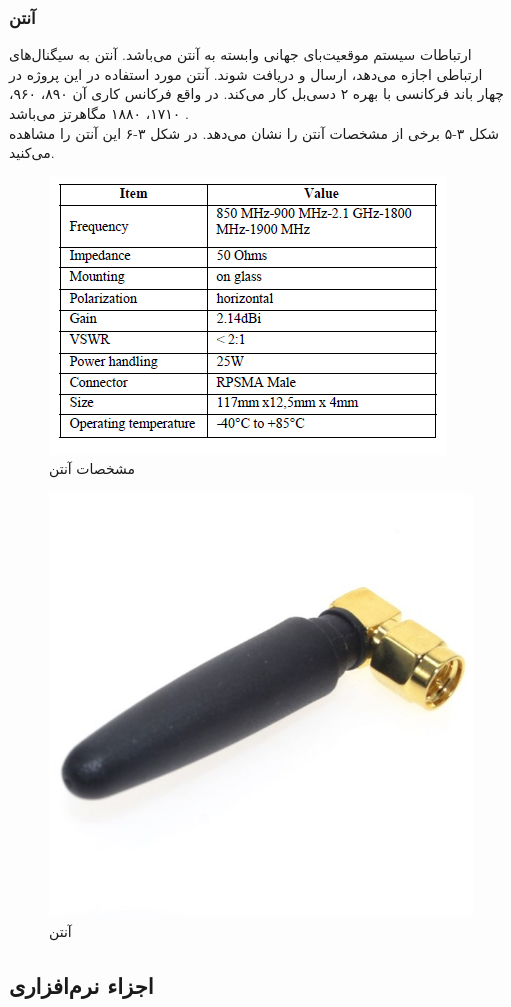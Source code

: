 \subsubsection{آنتن }
ارتباطات سیستم موقعیت‌بای جهانی وابسته به آنتن می‌باشد. آنتن به سیگنال‌های ارتباطی اجازه می‌دهد، ارسال و دریافت شوند. آنتن مورد استفاده در این پروژه در چهار باند فرکانسی با بهره ۲ دسی‌بل کار می‌کند. در واقع فرکانس کاری آن ۸۹۰، ۹۶۰، ۱۷۱۰، ۱۸۸۰ مگاهرتز می‌باشد \cite{Agrawal2018}.
\\
شکل ۳-۵ برخی از مشخصات آنتن را نشان می‌دهد. در شکل ۳-۶ این آنتن را مشاهده می‌کنید.
\begin{figure}[!h]
	\centerline{\includegraphics[width=.6\textwidth]{table1}}
	\caption{مشخصات آنتن  \cite{Mohamad2016}}
\end{figure}
\begin{figure}[!h]
	\centerline{\includegraphics[width=.3\textwidth]{GSM-antenna}}
	\caption{آنتن }
\end{figure}

\subsection{اجزاء نرم‌افزاری}
